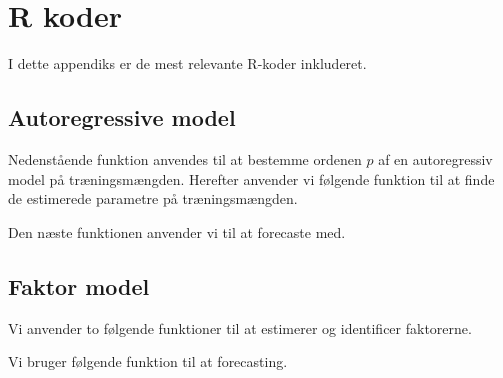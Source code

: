 \chapter{R koder} \label{app:r_koder}
I dette appendiks er de mest relevante R-koder inkluderet. 

\section{Autoregressive model} \label{sec:auto}
Nedenstående funktion anvendes til at bestemme ordenen $p$ af en autoregressiv model på træningsmængden.  
%
Herefter anvender vi følgende funktion til at finde de estimerede parametre på træningsmængden. 

Den næste funktionen anvender vi til at forecaste med. 

\section{Faktor model} \label{sec:faktor}
Vi anvender to følgende funktioner til at estimerer og identificer faktorerne. 


Vi bruger følgende funktion til at forecasting.
